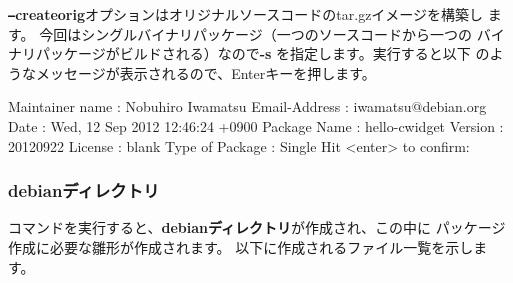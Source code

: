 \documentclass[mingoth,a4paper]{jsarticle}
\begin{document}
{\bf \texttt{--}createorig}オプションはオリジナルソースコードのtar.gzイメージを構築し
ます。 今回はシングルバイナリパッケージ（一つのソースコードから一つの
バイナリパッケージがビルドされる）なので{\bf -s} を指定します。実行すると以下
のようなメッセージが表示されるので、Enterキーを押します。

\begin{commandline}
Maintainer name  : Nobuhiro Iwamatsu
Email-Address    : iwamatsu@debian.org 
Date             : Wed, 12 Sep 2012 12:46:24 +0900
Package Name     : hello-cwidget
Version          : 20120922
License          : blank
Type of Package  : Single
Hit <enter> to confirm: 
\end{commandline}

\subsubsection{debianディレクトリ}
コマンドを実行すると、{\bf debianディレクトリ}が作成され、この中に
パッケージ作成に必要な雛形が作成されます。
以下に作成されるファイル一覧を示します。
\end{document}
